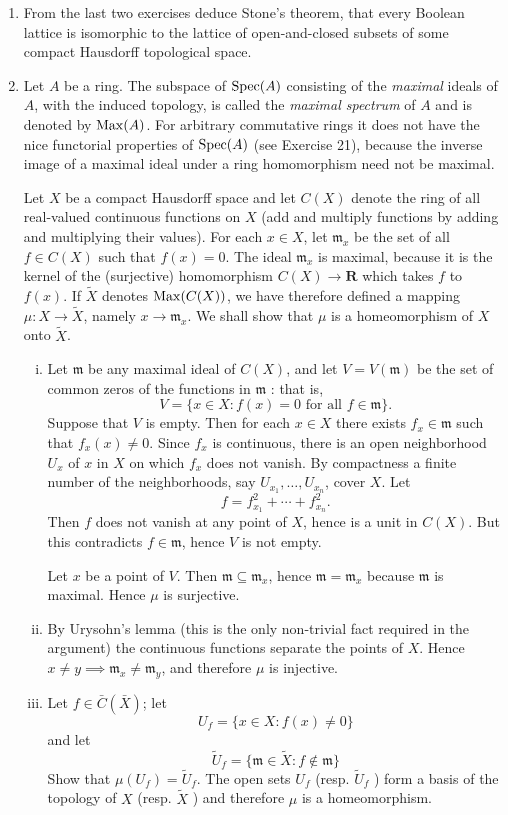 \documentclass[class=book, crop=false]{standalone}
\theoremstyle{definition}
\theoremstyle{remark}
\begin{document}
\begin{enumerate}[resume*=exc1]
  \item From the last two exercises deduce Stone's theorem, that every Boolean
        lattice is isomorphic to the lattice of open-and-closed subsets of some
        compact Hausdorff topological space.

  \item Let $A$ be a ring. The subspace of $\operatorname{Spec}(A)$ consisting
        of the \textit{maximal} ideals of $A$, with the induced topology, is called the
        \textit{maximal spectrum} of $A$ and is denoted by $\operatorname{Max}(A)$. For
        arbitrary commutative rings it does not have the nice functorial
        properties of $\operatorname{Spec}(A)$ (see Exercise 21), because the inverse image of
        a maximal ideal under a ring homomorphism need not be maximal.

Let $X$ be a compact Hausdorff space and let $C(X)$ denote the ring of all
real-valued continuous functions on $X$ (add and multiply functions by adding
and multiplying their values). For each $x \in X$, let $\mathfrak{m}_{x}$ be the
set of all $f \in C(X)$ such that $f(x)=0$. The ideal $\mathfrak{m}_{x}$ is
maximal, because it is the kernel of the (surjective) homomorphism
$C(X) \to \mathbf{R}$ which takes $f$ to $f(x)$. If $\tilde{X}$ denotes
$\operatorname{Max}(C(X))$, we have therefore defined a mapping
$\mu: X \to \tilde{X}$, namely $x \to \mathfrak{m}_{x}$. We shall show that $\mu$
is a homeomorphism of $X$ onto $\tilde{X}$.
\begin{enumerate}[i)]
  \item Let $\mathfrak{m}$ be any maximal ideal of $C(X)$, and let $V=V(\mathfrak{m})$ be the set of common zeros of the functions in $\mathfrak{m}$ : that is,
\[
  V=\{x \in X: f(x)=0 \text { for all } f \in \mathfrak{m}\}.
\]
Suppose that $V$ is empty. Then for each $x \in X$ there exists
$f_{x} \in \mathfrak{m}$ such that $f_{x}(x) \neq 0$. Since $f_{x}$ is
continuous, there is an open neighborhood $U_{x}$ of $x$ in $X$ on which $f_{x}$
does not vanish. By compactness a finite number of the neighborhoods, say
$U_{x_{1}}, \ldots, U_{x_{n}}$, cover $X$. Let
\[
  f=f_{x_{1}}^{2}+\cdots+f_{x_{n}}^{2}.
\]
Then $f$ does not vanish at any point of $X$, hence is a unit in $C(X)$. But
this contradicts $f \in \mathfrak{m}$, hence $V$ is not empty.

Let $x$ be a point of $V$. Then $\mathfrak{m} \subseteq \mathfrak{m}_{x}$, hence
$\mathfrak{m}=\mathfrak{m}_{x}$ because $\mathfrak{m}$ is maximal. Hence $\mu$
is surjective.
  \item By Urysohn's lemma (this is the only non-trivial fact required in the
argument) the continuous functions separate the points of $X$. Hence
$x \neq y \implies \mathfrak{m}_{x} \neq \mathfrak{m}_{y}$, and therefore $\mu$ is
injective.
  \item Let $f \in \bar{C}(\bar{X})$; let
\[
  U_{f}=\{x \in X: f(x) \neq 0\}
\]
and let
\[
  \tilde{U}_{f}=\{\mathfrak{m} \in \tilde{X}: f \notin \mathfrak{m}\}
\]
Show that $\mu\left(U_{f}\right)=\tilde{U}_{f}$. The open sets $U_{f}$ (resp.
$\tilde{U}_{f}$ ) form a basis of the topology of $X$ (resp. $\tilde{X}$ ) and
therefore $\mu$ is a homeomorphism.


\end{enumerate}
\end{enumerate}
\end{document}
